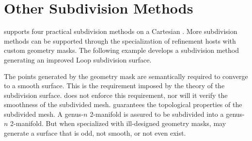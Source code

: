\section{Other Subdivision Methods}
 supports four practical subdivision methods on a
Cartesian . More subdivision methods can be supported
through the specialization of refinement hosts with custom geometry masks. 
The following example develops a subdivision method 
generating an improved Loop subdivision surface. 


The points generated by the geometry mask are semantically
required to converge to a smooth surface. This is the requirement
imposed by the theory of the subdivision surface.
 does not enforce this requirement, nor will
it verify the smoothness of the subdivided mesh. 
 guarantees the topological properties of 
the subdivided mesh. A genus-$n$ 2-manifold is assured to be subdivided
into a genus-$n$ 2-manifold. But when specialized with ill-designed
geometry masks,  may generate a surface that is 
odd, not smooth, or not even exist.


